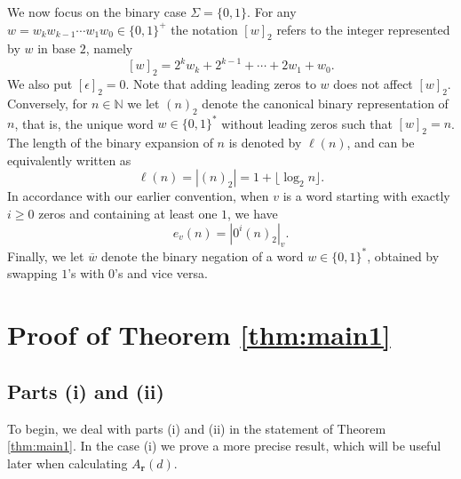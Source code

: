 \documentclass[a4paper,11pt]{amsart}
\theoremstyle{definition}
\newcommand{\N}{\mathbb{N}}
\begin{document}
We now focus on the binary case $\Sigma = \{0,1\}$.
For any $w = w_k w_{k-1} \cdots w_1 w_0 \in \{0,1\}^+$ the notation $[w]_2$ refers to the integer represented by $w$ in base $2$, namely
$$ [w]_2 = 2^k  w_k + 2^{k-1} +  \cdots + 2 w_1 + w_0. $$
We also put $[\epsilon]_2 = 0$. Note that adding leading zeros to $w$ does not affect $[w]_2$. Conversely, for $n \in \N$ we let $(n)_2$ denote the canonical binary representation of $n$, that is, the unique word $w \in \{0,1\}^*$ without leading zeros such that $[w]_2 = n$. The length of the binary expansion of $n$ is denoted by $\ell(n)$, and can be equivalently written as
$$ \ell(n) = |(n)_2| = 1 + \lfloor \log_2 n \rfloor. $$
In accordance with our earlier convention, when $v$ is a word starting with exactly $i \geq 0$ zeros and containing at least one $1$, we have
$$  e_{v}(n) = |0^i (n)_2|_v.  $$
Finally, we let $\overline{w}$ denote the binary negation of a word $w \in \{0,1\}^*$, obtained by swapping $1$'s with $0$'s and vice versa. 



\section{Proof of Theorem \ref{thm:main1}} \label{sec:main1}

\subsection{Parts (i) and (ii)}

To begin, we deal with parts (i) and (ii) in the statement of Theorem \ref{thm:main1}. In the case (i) we prove a more precise result, which will be useful later when calculating $A_{\mathbf{r}}(d)$.
\end{document}
